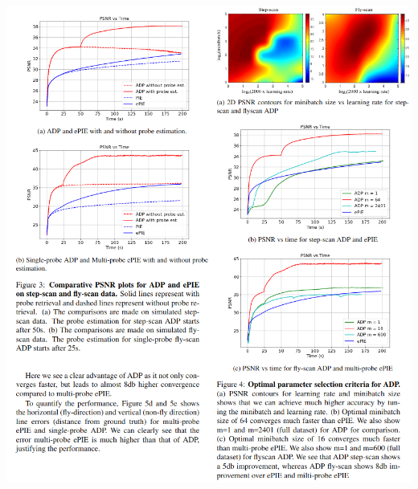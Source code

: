 \documentclass{article}
\begin{document}
\begin{center}
    \includegraphics[width=1\textwidth]{figures/nashed_perfResults.png}
\end{center}



\printbibliography
\end{document}
